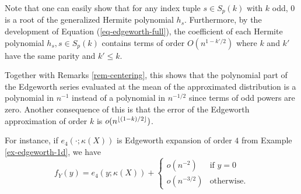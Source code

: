 \begin{remark} \label{rem-edge-mean}
    Note that one can easily show that for any index tuple $s \in S_p(k)$ with $k$ odd, 0 is a root of the generalized Hermite polynomial $h_s$. 
    Furthermore, by the development of Equation (\ref{eq-edgeworth-full}), the coefficient of each Hermite polynomial $h_s, s \in S_p(k)$ contains terms of order $O(n^{1-k'/2})$ where $k$ and $k'$ have the same parity and $k' \leq k$.

    Together with Remarks \ref{rem-centering}, this shows that the polynomial part of the Edgeworth series evaluated at the mean of the approximated distribution is a polynomial in $n^{-1}$ instead of a polynomial in $n^{-1/2}$ since terms of odd powers are zero. Another consequence of this is that the error of the Edgeworth approximation of order $k$ is $o(n^{\lfloor(1-k)/2\rfloor})$. 
    
    For instance, if $e_4(\cdot; \kappa(X))$ is Edgeworth expansion of order $4$ from Example \ref{ex-edgeworth-1d}, we have
    \begin{equation*}
        f_Y(y) = e_4(y; \kappa(X)) + \begin{cases}
            o(n^{-2}) &\text{if } y = 0\\
            o(n^{-3/2}) &\text{otherwise}.
        \end{cases} 
    \end{equation*} 
\end{remark}
